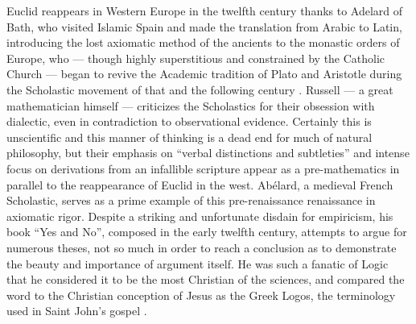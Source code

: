 \documentclass[12pt]{article}
\begin{document}
Euclid reappears in Western Europe
in the twelfth century
thanks to Adelard of Bath,
who visited Islamic Spain
and made the translation
from Arabic to Latin,
introducing the lost axiomatic method of the ancients
to the monastic orders of Europe,
who --- though highly superstitious
and constrained by the Catholic Church ---
began to revive the Academic tradition
of Plato and Aristotle during the Scholastic movement
of that and the following century \cite{russell}.
Russell --- a great mathematician himself ---
criticizes the Scholastics for their obsession
with dialectic, even in contradiction to observational evidence.
Certainly this is unscientific and this manner of thinking
is a dead end for much of natural philosophy,
but their emphasis on ``verbal distinctions and subtleties''
and intense focus on derivations from an infallible
scripture appear as a pre-mathematics in parallel
to the reappearance of Euclid in the west.
Ab\'elard, a medieval French Scholastic,
serves as a prime example of this pre-renaissance renaissance
in axiomatic rigor.
Despite a striking and unfortunate disdain for empiricism,
his book ``Yes and No'',
composed in the early twelfth century,
attempts to argue for numerous theses,
not so much in order to reach a conclusion
as to demonstrate
the beauty and importance 
of argument itself.
He was such a fanatic of Logic
that he considered it to be the
most Christian of the sciences,
and compared the word to the Christian
conception of Jesus as the Greek Logos,
the terminology used in Saint John's gospel \cite{russell}.
\end{document}
